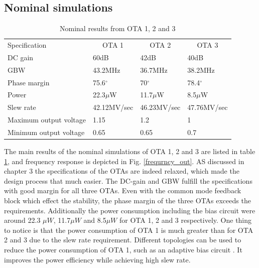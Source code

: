 \subsection{Nominal simulations}

\begin{table}[h]
\centering
\caption{Nominal results from OTA 1, 2 and 3}
\label{nominal_ota}
\begin{tabular}{l|l|l|l}
\hline
\multirow{1}{*}{Specification} & \multicolumn{1}{c|}{OTA 1} & \multicolumn{1}{c|}{OTA 2} & \multicolumn{1}{c}{OTA 3}  \\\cline{1-4}
                       
            DC gain       & 60dB & 42dB & 40dB\\
            GBW      & 43.2MHz & 36.7MHz & 38.2MHz\\
            Phase margin     & 75.6$^\circ$ & 70$^\circ$ & 78.4$^\circ$\\
            Power    & 22.3$\mu$W & 11.7$\mu$W & 8.5$\mu$W\\
            Slew rate   & 42.12MV/sec & 46.23MV/sec & 47.76MV/sec\\
            Maximum output voltage    & 1.15 & 1.2 & 1\\
            Minimum output voltage     & 0.65 & 0.65 & 0.7\\
            
\hline            
\end{tabular}
\end{table}

The main results of the nominal simulations of OTA 1, 2 and 3 are listed in table \ref{nominal_ota}, and frequency response is depicted in Fig. \ref{frequrncy_out}. AS discussed in chapter 3 the specifications of the OTAs are indeed relaxed, which made the design process that much easier. The DC-gain and GBW fulfill the specifications with good margin for all three OTAs. Even with the common mode feedback block which effect the stability, the phase margin of the three OTAs exceeds the requirements. Additionally the power consumption including the bias circuit were around 22.3 $\mu W$, 11.7$\mu W$ and 8.5$\mu W$ for OTA 1, 2 and 3 respectively. One thing to notice is that the power consumption of OTA 1 is much greater than for OTA 2 and 3 due to the slew rate requirement. Different topologies can be used to reduce the power consumption of OTA 1, such as an adaptive bias circuit \cite{adaptive}. It improves the power efficiency while achieving high slew rate. 

